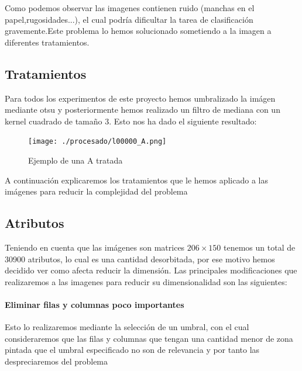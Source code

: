 \documentclass[8pt,a4paper]{{esannV2}}
\begin{document}
Como podemos observar las imagenes contienen ruido (manchas en el papel,rugosidades...), el cual podría dificultar la tarea de clasificación gravemente.Este problema lo hemos solucionado sometiendo a la imagen a diferentes tratamientos.

\subsection{Tratamientos}

Para todos los experimentos de este proyecto hemos umbralizado la imágen mediante otsu y posteriormente hemos realizado un filtro de mediana con un kernel cuadrado de tamaño 3.
Esto nos ha dado el siguiente resultado:
\begin{figure}[htbp]
	\centering
    \texttt{[image: ./procesado/l00000\_A.png]}
    \caption{Ejemplo de una A tratada}
\end{figure}

A continuación explicaremos los tratamientos que le hemos aplicado a las imágenes para reducir la complejidad del problema

\subsection{Atributos}
Teniendo en cuenta que las imágenes son matrices $206\times150$ tenemos un total de 30900 atributos, lo cual es una cantidad desorbitada, por ese motivo hemos decidido ver como afecta reducir la dimensión.
Las principales modificaciones que realizaremos a las imagenes para reducir su dimensionalidad son las siguientes:

\paragraph{Eliminar filas y columnas poco importantes}


Esto lo realizaremos mediante la selección de un umbral, con el cual consideraremos que las filas y columnas que tengan una cantidad menor de zona pintada que el umbral especificado no son de relevancia y por tanto las despreciaremos del problema
\end{document}
